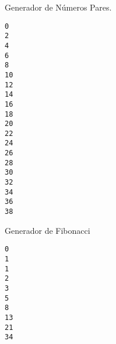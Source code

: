 \begin{code} Generador de Números Pares.

\begin{Shaded}
\begin{Highlighting}[]
\OperatorTok{=} 
     \NormalTok{:}
\OperatorTok{+=} 

\OperatorTok{=}
\NormalTok{ \_ } \NormalTok{(}\NormalTok{):}
    \NormalTok{(}
\end{Highlighting}
\end{Shaded}

\begin{verbatim}
0
2
4
6
8
10
12
14
16
18
20
22
24
26
28
30
32
34
36
38

\end{verbatim}
\end{code}

\begin{code}
Generador de Fibonacci

\begin{Shaded}
\begin{Highlighting}[]
\OperatorTok{=} \NormalTok{, }
     \NormalTok{:}
\OperatorTok{=}\OperatorTok{+}

\OperatorTok{=}
\NormalTok{ \_ } \NormalTok{(}\NormalTok{):}
    \NormalTok{(}
\end{Highlighting}
\end{Shaded}

\begin{verbatim}
0
1
1
2
3
5
8
13
21
34

\end{verbatim}
\end{code}

